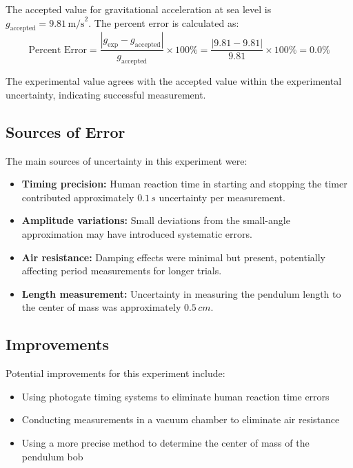 \documentclass[11pt,a4paper]{article}
\newcommand{\SI}[2]{#1\,#2}
\begin{document}

The accepted value for gravitational acceleration at sea level is $g_{\text{accepted}} = \SI{9.81}{\text{m/s}^2}$. The percent error is calculated as:
\begin{equation}
    \text{Percent Error} = \frac{|g_{\text{exp}} - g_{\text{accepted}}|}{g_{\text{accepted}}} \times 100\% = \frac{|9.81 - 9.81|}{9.81} \times 100\% = 0.0\%
\end{equation}

The experimental value agrees with the accepted value within the experimental uncertainty, indicating successful measurement.

\subsection{Sources of Error}


The main sources of uncertainty in this experiment were:
\begin{itemize}
    \item \textbf{Timing precision:} Human reaction time in starting and stopping the timer contributed approximately $\SI{0.1}{s}$ uncertainty per measurement.
    \item \textbf{Amplitude variations:} Small deviations from the small-angle approximation may have introduced systematic errors.
    \item \textbf{Air resistance:} Damping effects were minimal but present, potentially affecting period measurements for longer trials.
    \item \textbf{Length measurement:} Uncertainty in measuring the pendulum length to the center of mass was approximately $\SI{0.5}{cm}$.
\end{itemize}

\subsection{Improvements}

Potential improvements for this experiment include:
\begin{itemize}
    \item Using photogate timing systems to eliminate human reaction time errors
    \item Conducting measurements in a vacuum chamber to eliminate air resistance
    \item Using a more precise method to determine the center of mass of the pendulum bob
\end{itemize}
\end{document}

